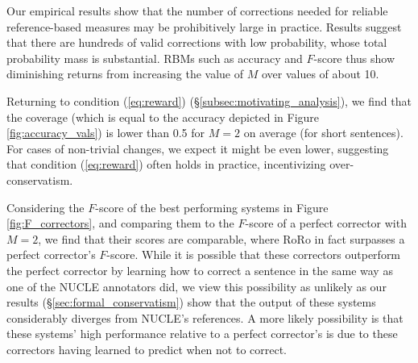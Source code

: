 \documentclass[letterpaper, 11pt]{article}
\newcommand{\oa}[1]{\footnote{\color{red}OA: #1}}
\begin{document}
Our empirical results show that the number of corrections needed for reliable reference-based measures may
be prohibitively large in practice.
Results suggest that there are hundreds of valid corrections with low probability, whose total probability mass
is substantial. RBMs such as accuracy and $F$-score thus show diminishing returns from increasing the value of $M$ over values of about 10.
%
%
%

Returning to condition (\ref{eq:reward}) (\S \ref{subsec:motivating_analysis}), we find that the coverage
(which is equal to the accuracy depicted in Figure \ref{fig:accuracy_vals})
is lower than 0.5 for $M=2$ on average (for short sentences). For cases of non-trivial
changes, we expect it might be even lower, suggesting that condition (\ref{eq:reward}) often
holds in practice, incentivizing over-conservatism.

Considering the $F$-score of the best performing systems in Figure \ref{fig:F_correctors}, and
comparing them to the $F$-score of a perfect corrector with $M=2$, we find that their scores are comparable,
where RoRo in fact surpasses a perfect corrector's $F$-score.
While it is possible that these correctors outperform the perfect corrector by learning how to
correct a sentence in the same way as one of the NUCLE annotators did, we view this possibility
as unlikely as our results (\S\ref{sec:formal_conservatism}) show that
the output of these systems considerably diverges from NUCLE's references.
A more likely possibility is that these systems' high performance relative to a perfect corrector's
is due to these correctors having learned to predict when not to correct.
\end{document}
